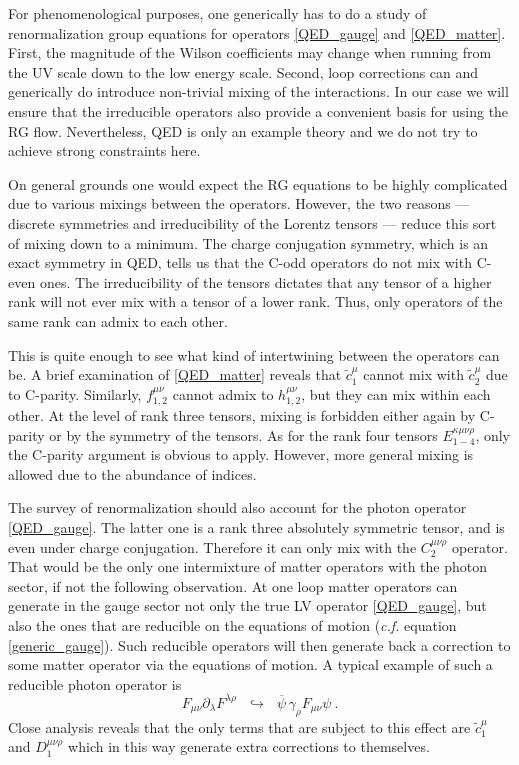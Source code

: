 \documentclass[12pt]{revtex4}
\newcommand{\wt}{\widetilde}
\newcommand{\ov}{\overline}
\begin{document}
	For phenomenological purposes, one generically has to do a study
	of renormalization group equations for operators
	\eqref{QED_gauge} and \eqref{QED_matter}.
	First, the magnitude of the Wilson coefficients may change when
	running from the UV scale down to the low energy scale.
	Second, loop corrections can and generically do introduce
	non-trivial mixing of the interactions.
	In our case we will ensure that the irreducible operators
	also provide a convenient basis for using the RG flow.
	Nevertheless, QED is only an example theory and we do not
	try to achieve strong constraints here. 

	On general grounds one would expect the RG equations to be highly
	complicated due to various mixings between the operators.
	However, the two reasons --- discrete symmetries and irreducibility
	of the Lorentz tensors --- reduce this sort of mixing down to
	a minimum.
	The charge conjugation symmetry, which is an exact symmetry in QED,
	tells us that the C-odd operators do not mix with C-even ones.
	The irreducibility of the tensors dictates that any tensor of
	a higher rank will not ever mix with a tensor of a lower rank.
	Thus, only operators of the same rank can admix to each other.
	
	This is quite enough to see what kind of intertwining between 
	the operators can be.
	A brief examination of \eqref{QED_matter} reveals that
	$ \wt{c}_1^\mu $ cannot mix with $ \wt{c}_2^\mu $ due to C-parity.
	Similarly, $ f_{1,2}^{\mu\nu} $ cannot admix to $ h_{1,2}^{\mu\nu} $,
	but they can mix within each other.
	At the level of rank three tensors, mixing is forbidden either
	again by C-parity or by the symmetry of the tensors. 
	As for the rank four tensors $ E_{1-4}^{\kappa\mu\nu\rho} $,
	only the C-parity argument is obvious to apply.
	However, more general mixing is allowed due to the abundance
	of indices.
		
	The survey of renormalization should also account for the photon
	operator \eqref{QED_gauge}.
	The latter one is a rank three absolutely symmetric tensor, 
	and is even under charge conjugation.  
	Therefore it can only mix with the $ C_2^{\mu\nu\rho} $ operator.
	That would be the only one intermixture of matter operators with
	the photon sector, if not the following observation.
	At one loop matter operators can generate in the gauge sector not 
	only the true LV operator \eqref{QED_gauge}, 
	but also the ones that are reducible on the equations of motion
	({\it c.f.} equation \eqref{generic_gauge}).
	Such reducible operators will then generate back a correction to 
	some matter operator via the equations of motion.
	A typical example of such a reducible photon operator is 
\[
 	F_{\mu\nu} \partial_\lambda F^{\lambda\rho} 
	~~~\hookrightarrow~~~
		\ov{\psi}\, \gamma_\rho F_{\mu\nu} \psi
	~.
\]
	Close analysis reveals that the only terms that are subject
	to this effect are $ \wt{c}_1^\mu $ and $ D_1^{\mu\nu\rho} $
	which in this way generate extra corrections to themselves.
\end{document}
